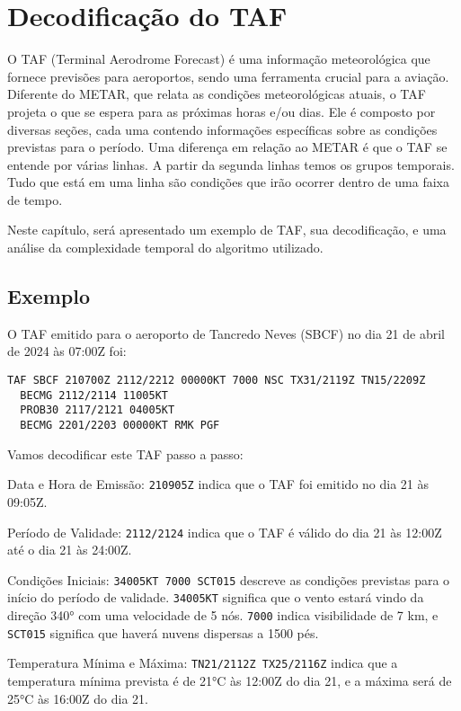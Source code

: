\chapter{Decodificação do TAF}

O TAF (Terminal Aerodrome Forecast) é uma informação meteorológica que fornece
previsões para aeroportos, sendo uma ferramenta crucial para a aviação. Diferente
do METAR, que relata as condições meteorológicas atuais, o TAF projeta o que se
espera para as próximas horas e/ou dias. Ele é composto por diversas seções,
cada uma contendo informações específicas sobre as condições previstas para o
período. Uma diferença em relação ao METAR é que o TAF se entende por várias linhas.
A partir da segunda linhas temos os grupos temporais. Tudo que está em uma linha
são condições que irão ocorrer dentro de uma faixa de tempo. 

Neste capítulo, será apresentado um exemplo de TAF, sua decodificação,
e uma análise da complexidade temporal do algoritmo utilizado.

\section{Exemplo}
O TAF emitido para o aeroporto de Tancredo Neves (SBCF) no dia 21 de abril de 2024 às 07:00Z foi:

\begin{verbatim}
TAF SBCF 210700Z 2112/2212 00000KT 7000 NSC TX31/2119Z TN15/2209Z 
  BECMG 2112/2114 11005KT 
  PROB30 2117/2121 04005KT 
  BECMG 2201/2203 00000KT RMK PGF
\end{verbatim}

Vamos decodificar este TAF passo a passo:

Data e Hora de Emissão:
\texttt{210905Z} indica que o TAF foi emitido no dia 21 às 09:05Z.

Período de Validade:
\texttt{2112/2124} indica que o TAF é válido do dia 21 às 12:00Z até o dia 21 às 24:00Z.

Condições Iniciais:
\texttt{34005KT 7000 SCT015} descreve as condições previstas para o início
do período de validade. \texttt{34005KT} significa que o vento estará vindo
da direção 340° com uma velocidade de 5 nós. \texttt{7000} indica visibilidade
de 7 km, e \texttt{SCT015} significa que haverá nuvens dispersas a 1500 pés.

Temperatura Mínima e Máxima:
\texttt{TN21/2112Z TX25/2116Z} indica que a temperatura mínima prevista é de 21°C
às 12:00Z do dia 21, e a máxima será de 25°C às 16:00Z do dia 21.

